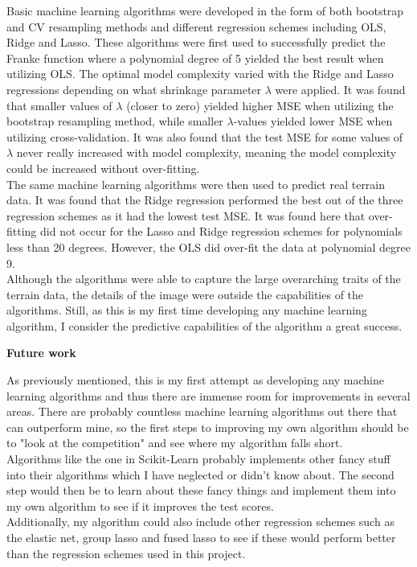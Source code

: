 \documentclass[12pt,a4paper]{article}
\begin{document}
\noindent Basic machine learning algorithms were developed in the form of both bootstrap and CV resampling methods and different regression schemes including OLS, Ridge and Lasso. These algorithms were first used to successfully predict the Franke function where a polynomial degree of 5 yielded the best result when utilizing OLS. The optimal model complexity varied with the Ridge and Lasso regressions depending on what shrinkage parameter $\lambda$ were applied. It was found that smaller values of $\lambda$ (closer to zero) yielded higher MSE when utilizing the bootstrap resampling method, while smaller $\lambda$-values yielded lower MSE when utilizing cross-validation. It was also found that the test MSE for some values of $\lambda$ never really increased with model complexity, meaning the model complexity could be increased without over-fitting. 
\\
The same machine learning algorithms were then used to predict real terrain data. It was found that the Ridge regression performed the best out of the three regression schemes as it had the lowest test MSE. It was found here that over-fitting did not occur for the Lasso and Ridge regression schemes for polynomials less than 20 degrees. However, the OLS did over-fit the data at polynomial degree 9. 
\\
Although the algorithms were able to capture the large overarching traits of the terrain data, the details of the image were outside the capabilities of the algorithms. Still, as this is my first time developing any machine learning algorithm, I consider the predictive capabilities of the algorithm a great success. 

\newpage

\begin{center}
\Large{\textbf{Future work}}
\end{center}

\noindent As previously mentioned, this is my first attempt as developing any machine learning algorithms and thus there are immense room for improvements in several areas. There are probably countless machine learning algorithms out there that can outperform mine, so the first steps to improving my own algorithm should be to "look at the competition" and see where my algorithm falls short.
\\
Algorithms like the one in Scikit-Learn probably implements other fancy stuff into their algorithms which I have neglected or didn't know about. The second step would then be to learn about these fancy things and implement them into my own algorithm to see if it improves the test scores. 
\\
Additionally, my algorithm could also include other regression schemes such as the elastic net, group lasso and fused lasso to see if these would perform better than the regression schemes used in this project.
\end{document}
